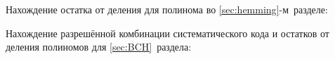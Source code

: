 \newpage
{} 

Нахождение остатка от деления для полинома во
\ref{sec:hemming}-м~разделе:  



Нахождение разрешённой комбинации систематического кода и остатков от
деления полиномов для \ref{sec:BCH}~раздела:

 \newpage


